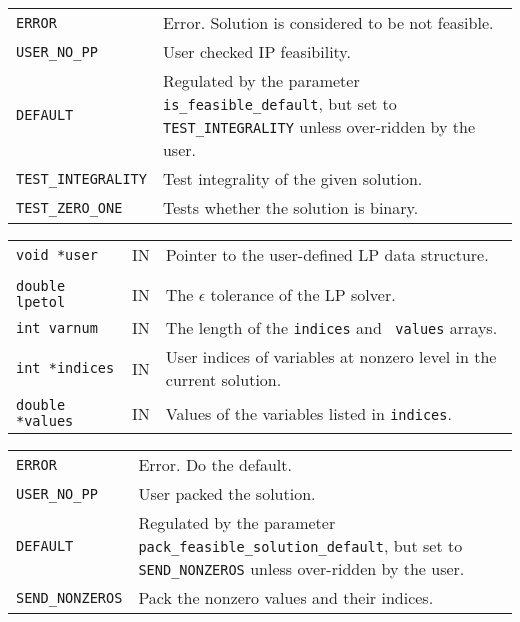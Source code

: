 \documentclass[twoside,11pt]{article}
\begin{document}
{\newpage
\clearpage
\samepage \begin{tabular}{lp{300pt}}
{\tt ERROR} & Error. Solution is considered to be not feasible.\\ 
{\tt USER\_NO\_PP} & User checked IP feasibility. \\ 
{\tt DEFAULT} & Regulated by the parameter {\tt is\_feasible\_default},
but set to {\tt TEST\_INTEGRALITY} unless over-ridden by the user.\\ 
{\tt TEST\_INTEGRALITY} & Test integrality of the given solution. \\ 
{\tt TEST\_ZERO\_ONE} & Tests whether the solution is binary. \\ 
\end{tabular}
}

{\newpage
\clearpage
\samepage \begin{tabular}{llp{290pt}}
{\tt void *user} & IN & Pointer to the user-defined LP data structure. \\ 
& & \\ 
{\tt double lpetol} & IN & The $\epsilon$ tolerance of the LP solver. \\ 
{\tt int varnum} & IN & The length of the {\tt indices} and {\tt
values} arrays.\\ 
{\tt int *indices} & IN & User indices of variables at nonzero level
in the current solution.\\ 
{\tt double *values} & IN & Values of the variables listed in {\tt indices}.\\ 
\end{tabular}
}

{\newpage
\clearpage
\samepage \begin{tabular}{lp{315pt}}
{\tt ERROR} & Error. Do the default.\\ 
{\tt USER\_NO\_PP} & User packed the solution.\\ 
{\tt DEFAULT} & Regulated by the parameter {\tt
pack\_feasible\_solution\_default}, but set to {\tt SEND\_NONZEROS}
unless over-ridden by the user.\\ 
{\tt SEND\_NONZEROS} & Pack the nonzero values and their indices.\\ 
\end{tabular}
}
\end{document}
